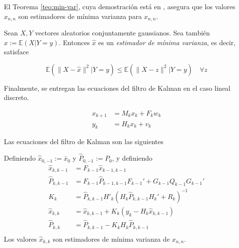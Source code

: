 El Teorema \ref{teo:min-var}, cuya demostración está en \cite{Anderson2005}, asegura que los valores \(\hat{x}_{n,n}\) son estimadores de mínima varianza para \(x_{n,n}\).

\begin{teo}
\label{teo:min-var}
Sean \(X, Y\) vectores aleatorios conjuntamente gaussianos. Sea también \(\hat{x} := \mathbb{E}(X|Y=y)\). Entonces \(\hat{x}\) es un
\emph{estimador de mínima varianza}, es decir, satisface

\[
\mathbb{E}(\| X - \hat{x}\|^2 | Y = y) \leq \mathbb{E}(\| X - z\|^2 | Y = y) \quad \forall z
\]
\end{teo}

Finalmente, se entregan las ecuaciones del filtro de Kalman en el caso lineal discreto.

\[
\begin{aligned}
x_{k+1} &= M_k x_k + F_k w_k \\ 
y_k &= H_k x_k + v_k
\end{aligned}
\]

Las ecuaciones del filtro de Kalman son las siguientes 


\begin{mdframed}[style=mystyle,frametitle=Filtro de Kalman Lineal Discreto]
Definiendo \(\hat{x}_{0,-1}:= \bar{x}_0\) y \(\hat{P}_{0,-1}:= P_0\), y definiendo 
\[
\begin{aligned}
\hat{x}_{k,k-1} &= F_{k-1} \hat{x}_{k-1,k-1} \\
\hat{P}_{k,k-1} &= F_{k-1} \hat{P}_{k-1,k-1} F_{k-1}' + G_{k-1} Q_{k-1} G_{k-1}'\\
K_k &= \hat{P}_{k,k-1} H'_{k}(H_{k}\hat{P}_{k,k-1}H_{k}' + R_k)^{-1}\\
\hat{x}_{k,k} &= \hat{x}_{k, k-1} + K_k(y_k-H_k \hat{x}_{k,k-1}) \\
\hat{P}_{k,k} &= \hat{P}_{k,k-1}- K_k H_{k}\hat{P}_{k,k-1} \\
\end{aligned}
\]
Los valores \(\hat{x}_{k,k}\) son estimadores de mínima varianza de \(x_{n,n}\). 
\end{mdframed}




